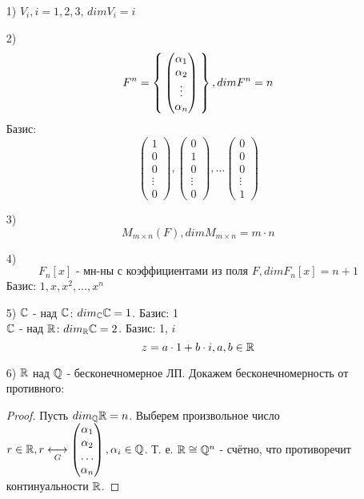 \begin{example}
\begin{itemize}
  \item [1) ] $V_i, i = 1, 2, 3$, $dim V_i = i$
  \item [2) ]
    \[
      F^{n} = \Set{\begin{pmatrix} \alpha_1 \\ \alpha_2 \\ \vdots \\ \alpha_n\end{pmatrix}}, dim F^{n} = n
    \]
    Базис:
    \[
    \begin{pmatrix}1 \\ 0 \\ 0 \\ \vdots \\ 0 \end{pmatrix}, \begin{pmatrix} 0 \\ 1 \\ 0 \\ \vdots \\ 0 \end{pmatrix}, \ldots \begin{pmatrix}0 \\ 0 \\ 0 \\ \vdots \\ 1 \end{pmatrix}
    \]
  \item [3) ] \[
  M_{m \times n} (F), dim M_{m \times n} = m \cdot n
  \]
\item [4) ] \[
  F_n[x] \text{ - мн-ны с коэффициентами из поля $F$}, dim F_n[x] = n + 1
\]
Базис: $1, x, x^{2}, \ldots, x^{n}$
\item [5) ] $\mathbb{C}$ - над $\mathbb{C}$: $dim_{\mathbb{C}} \mathbb{C} = 1$. Базис: 1 \\
      $\mathbb{C}$ - над $\mathbb{R} \colon dim_{\mathbb{R}} \mathbb{C} = 2$. Базис: 1, $i$
      \[
      z = a \cdot 1 + b \cdot i, a, b \in \mathbb{R}
      \]
    \item [6) ] $\mathbb{R}$ над $\mathbb{Q}$ - бесконечномерное ЛП. Докажем бесконечномерность от противного:
      \begin{proof}
      Пусть $dim_{\mathbb{Q}} \mathbb{R} = n$. Выберем произвольное число $r \in \mathbb{R}, r \underset{G}{\longleftrightarrow} \begin{pmatrix} \alpha_1 \\ \alpha_2 \\ \ldots \\ \alpha_n \end{pmatrix}, \alpha_i \in \mathbb{Q}$. Т. е. $\mathbb{R} \cong \mathbb{Q}^{n}$ - счётно, что противоречит континуальности $\mathbb{R}$.
      \end{proof}
\end{itemize}
\end{example}
